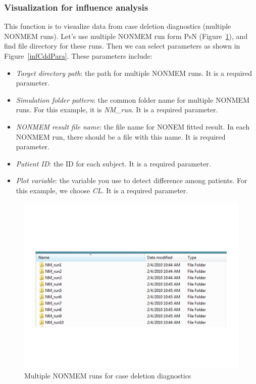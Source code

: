 \documentclass[a4paper]{article}
\begin{document}
\subsubsection{Visualization for influence analysis}
This function is to visualize data from case deletion diagnostics (multiple NONMEM runs). Let's use multiple NONMEM run form PsN (Figure~\ref{infCddData}), and find file directory for these runs. Then we can select parameters as shown in Figure~\ref{infCddPara}.  These parameters include:
\begin{itemize}
	\item \textit{Target directory path}: the path for multiple NONMEM runs. It is a required parameter.
	\item \textit{Simulation folder pattern}: the common folder name for multiple NONMEM runs. For this example, it is \textit{NM\_run}. It is a required parameter.
	\item \textit{NONMEM result file name}: the file name for NONEM fitted result. In each NONMEM run, there should be a file with this name. It is required parameter.	
	\item \textit{Patient ID}: the ID for each subject. It is a required parameter.
	\item \textit{Plot variable}: the variable you use to detect difference among patients. For this example, we choose \textit{CL}. It is a required parameter.
\end{itemize}
\begin{figure}[h!tb] \centering
\includegraphics[scale=0.6]{infCddData.pdf}
\caption{Multiple NONMEM runs for case deletion diagnostics}
\label{infCddData}
\end{figure}
\end{document}

